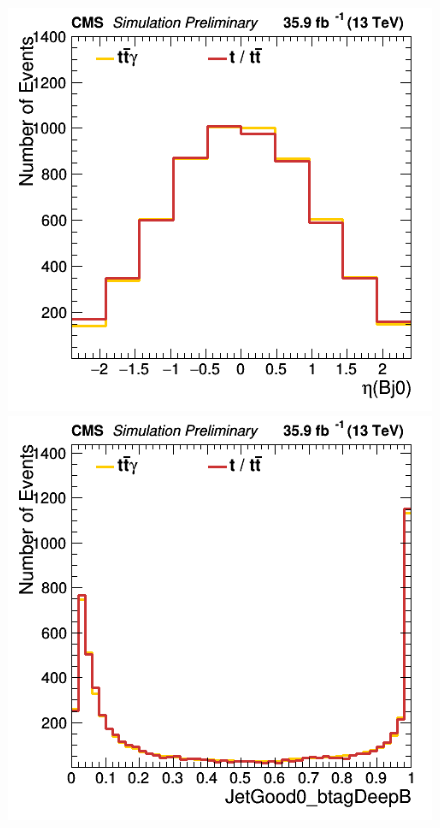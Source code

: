 \documentclass[11pt]{scrartcl}
\begin{document}
\begin{figure}[H]
\centering
\begin{minipage}{.5\textwidth}
  \centering
  \includegraphics[width=0.70\linewidth]{figures/Notused/Bj0_eta.png}
\end{minipage}%
\begin{minipage}{.5\textwidth}
  \centering
  \includegraphics[width=0.70\linewidth]{figures/Notused/JetGood0_btagDeepB.png}
\end{minipage}
\label{fig:Bj0eta}
\end{figure}
\end{document}
